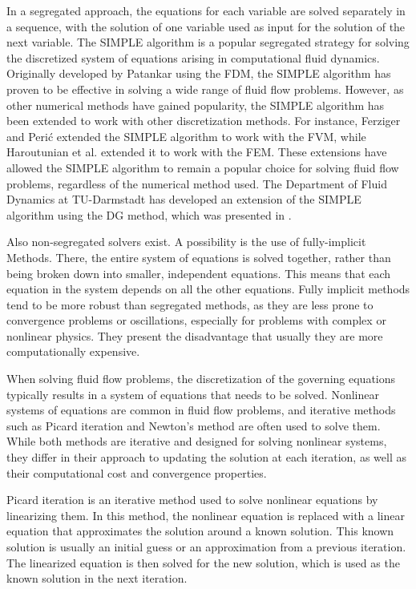 In a segregated approach, the equations for each variable are solved separately in a sequence, with the solution of one variable used as input for the solution of the next variable.  The \gls{SIMPLE} algorithm is a popular segregated strategy for solving the discretized system of equations arising in computational fluid dynamics. Originally developed by Patankar \parencite{patankarNumericalHeatTransfer1980} using the \gls{FDM}, the SIMPLE algorithm has proven to be effective in solving a wide range of fluid flow problems. However, as other numerical methods have gained popularity, the SIMPLE algorithm has been extended to work with other discretization methods. For instance, Ferziger and Perić \parencite{ferzigerComputationalMethodsFluid2002} extended the SIMPLE algorithm to work with the \gls{FVM}, while Haroutunian et al. \parencite{haroutunianSegregatedFiniteElement1993} extended it to work with the \gls{FEM}. These extensions have allowed the SIMPLE algorithm to remain a popular choice for solving fluid flow problems, regardless of the numerical method used. The Department of Fluid Dynamics at TU-Darmstadt has developed an extension of the SIMPLE algorithm using the DG method, which was presented in \textcite{kleinHighorderDiscontinuousGalerkin2015}.

Also non-segregated solvers exist. A possibility is the use of fully-implicit Methods. There, the entire system of equations is solved together, rather than being broken down into smaller, independent equations. This means that each equation in the system depends on all the other equations. Fully implicit methods tend to be more robust than segregated methods, as they are less prone to convergence problems or oscillations, especially for problems with complex or nonlinear physics. They present the disadvantage that usually they are more computationally expensive.

When solving fluid flow problems, the discretization of the governing equations typically results in a system of equations that needs to be solved. Nonlinear systems of equations are common in fluid flow problems, and iterative methods such as Picard iteration and Newton's method are often used to solve them. While both methods are iterative and designed for solving nonlinear systems, they differ in their approach to updating the solution at each iteration, as well as their computational cost and convergence properties.

Picard iteration is an iterative method used to solve nonlinear equations by linearizing them. In this method, the nonlinear equation is replaced with a linear equation that approximates the solution around a known solution. This known solution is usually an initial guess or an approximation from a previous iteration. The linearized equation is then solved for the new solution, which is used as the known solution in the next iteration. 

